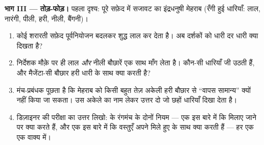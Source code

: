 \begin{problem}
\medskip\noindent\textbf{भाग III --- तोड़-फोड़।}
पहला दृश्य: पूरे सफ़ेद  में सजावट का इंद्रधनुषी मेहराब (रँगी हुई
धारियाँ: लाल, नारंगी, पीली, हरी, नीली, बैंगनी)।
\begin{enumerate}[resume]
  \item कोई शरारती सफ़ेद पूर्वनियोजन बदलकर शुद्ध लाल कर देता है। अब
        दर्शकों को धारी दर धारी क्या दिखता है?
  \item निर्देशक मौक़े पर ही लाल \emph{और} नीली बौछारें एक साथ माँग
        लेता है। कौन-सी धारियाँ जी उठती हैं, और मैजेंटा-सी बौछार हरी
        धारी के साथ क्या करती है?
  \item मंच-प्रबंधक पूछता है कि मेहराब को किसी बहुत तेज़ अकेली हरी
        बौछार से ``वापस सामान्य'' क्यों नहीं किया जा सकता। उस अकेले
         का नाम लेकर उत्तर दो जो छहों धारियाँ दिखा देता है।
  \item डिज़ाइनर की परीक्षा का उत्तर लिखो:  के रंगमंच के दोनों
        नियम --- एक इस बारे में कि मिलाए जाने पर  क्या करते
        हैं, और एक इस बारे में कि वस्तुएँ अपने मिले हुए के साथ क्या
        करती हैं --- हर एक एक वाक्य में।
\end{enumerate}
\end{problem}
